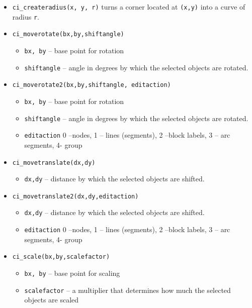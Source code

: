 \begin{itemize}
\item{\tt ci\_createradius(x, y, r)} turns a corner located at {\tt (x,y)} into a curve of radius {\tt r}.

\item{\tt ci\_moverotate(bx,by,shiftangle)}
        \begin{itemize}
        \item{\tt bx, by} -- base point for rotation
        \item{\tt shiftangle} -- angle in degrees by which the selected objects are rotated.
        \end{itemize}

\item{\tt ci\_moverotate2(bx,by,shiftangle, editaction)}
        \begin{itemize}
        \item{\tt bx, by} -- base point for rotation
        \item{\tt shiftangle} -- angle in degrees by which the selected objects are rotated.
        \item{\tt editaction}  0 --nodes, 1 -- lines (segments), 2 --block labels, 3 -- arc
                segments, 4- group
        \end{itemize}

\item{\tt ci\_movetranslate(dx,dy)}
        \begin{itemize}
        \item{\tt dx,dy} -- distance by which the selected objects are shifted.
        \end{itemize}

\item{\tt ci\_movetranslate2(dx,dy,editaction)}
        \begin{itemize}
        \item{\tt dx,dy} -- distance by which the selected objects are shifted.
        \item{\tt editaction}  0 --nodes, 1 -- lines (segments), 2 --block labels, 3 -- arc
                segments, 4- group
        \end{itemize}

\item{\tt ci\_scale(bx,by,scalefactor)}
        \begin{itemize}
        \item{\tt bx, by} -- base point for scaling
        \item{\tt scalefactor} -- a multiplier that determines how
        much the selected objects are scaled
        \end{itemize}


\end{itemize}
